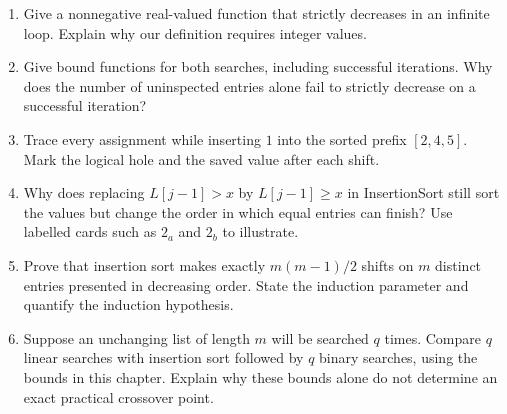 \begin{enumerate}
not a rearrangement of its original contents.
\item Give a nonnegative real-valued function that strictly decreases
in an infinite loop. Explain why our definition requires integer values.
\item Give bound functions for both searches, including successful
iterations. Why does the number of uninspected entries alone fail to
strictly decrease on a successful iteration?
\item Trace every assignment while inserting $1$ into the sorted prefix
$[2,4,5]$. Mark the logical hole and the saved value after each shift.
\item Why does replacing $L[j-1]>x$ by $L[j-1]\geq x$ in InsertionSort
still sort the values but change the order in which equal entries can finish?
Use labelled cards such as $2_a$ and $2_b$ to illustrate.
\item Prove that insertion sort makes exactly $m(m-1)/2$ shifts on
$m$ distinct entries presented in decreasing order. State the induction
parameter and quantify the induction hypothesis.
\item Suppose an unchanging list of length $m$ will be searched $q$ times.
Compare $q$ linear searches with insertion sort followed by $q$ binary
searches, using the bounds in this chapter. Explain why these bounds alone
do not determine an exact practical crossover point.
\end{enumerate}
